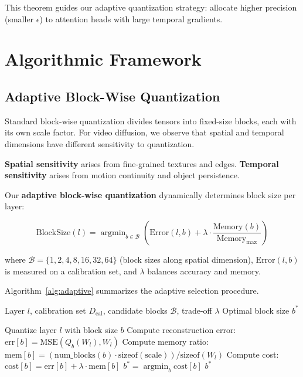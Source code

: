 \documentclass[journal]{IEEEtran}
\theoremstyle{definition}
\theoremstyle{remark}
\newcommand{\argmin}{\operatorname{argmin}}
\begin{document}
This theorem guides our adaptive quantization strategy: allocate higher precision (smaller $\epsilon$) to attention heads with large temporal gradients.

\section{Algorithmic Framework}
\label{sec:algorithm}

\subsection{Adaptive Block-Wise Quantization}

Standard block-wise quantization \cite{dettmers2022llm} divides tensors into fixed-size blocks, each with its own scale factor. For video diffusion, we observe that spatial and temporal dimensions have different sensitivity to quantization.

\textbf{Spatial sensitivity} arises from fine-grained textures and edges. \textbf{Temporal sensitivity} arises from motion continuity and object persistence.

Our \textbf{adaptive block-wise quantization} dynamically determines block size per layer:

\begin{equation}
\text{BlockSize}(l) = \argmin_{b \in \mathcal{B}} \left( \text{Error}(l, b) + \lambda \cdot \frac{\text{Memory}(b)}{\text{Memory}_{\text{max}}} \right)
\end{equation}

where $\mathcal{B} = \{1, 2, 4, 8, 16, 32, 64\}$ (block sizes along spatial dimension), $\text{Error}(l,b)$ is measured on a calibration set, and $\lambda$ balances accuracy and memory.

Algorithm~\ref{alg:adaptive} summarizes the adaptive selection procedure.

\begin{algorithm}[t]
\caption{Adaptive Block-Wise Quantization}
\label{alg:adaptive}
\begin{algorithmic}[1]
\REQUIRE Layer $l$, calibration set $D_{\text{cal}}$, candidate blocks $\mathcal{B}$, trade-off $\lambda$
\ENSURE Optimal block size $b^*$

    \STATE Quantize layer $l$ with block size $b$
    \STATE Compute reconstruction error: $\text{err}[b] = \text{MSE}(Q_b(W_l), W_l)$
    \STATE Compute memory ratio: $\text{mem}[b] = (\text{num\_blocks}(b) \cdot \text{sizeof}(\text{scale})) / \text{sizeof}(W_l)$
    \STATE Compute cost: $\text{cost}[b] = \text{err}[b] + \lambda \cdot \text{mem}[b]$
\ENDFOR
\STATE $b^* = \argmin_b \text{cost}[b]$
\RETURN $b^*$
\end{algorithmic}
\end{algorithm}
\end{document}
